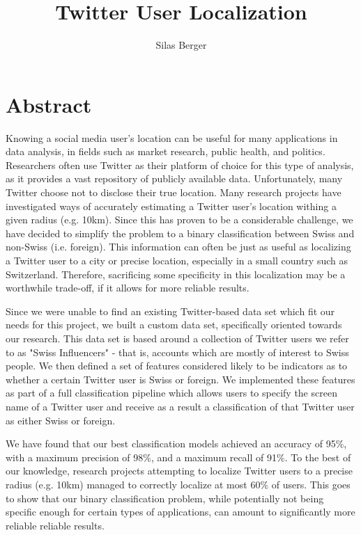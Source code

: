 \documentclass[10pt,a4paper]{article}
\title{Twitter User Localization\\[0.2em]\smaller{Master Thesis Report}}
\author{Silas Berger}
\begin{document}
\maketitle
\clearpage

\section*{Abstract}
Knowing a social media user's location can be useful for many applications in data analysis, in fields such as market research, public health, and politics. Researchers often use Twitter as their platform of choice for this type of analysis, as it provides a vast repository of publicly available data. Unfortunately, many Twitter choose not to disclose their true location. Many research projects have investigated ways of accurately estimating a Twitter user's location withing a given radius (e.g. 10km). Since this has proven to be a considerable challenge, we have decided to simplify the problem to a binary classification between Swiss and non-Swiss (i.e. foreign). This information can often be just as useful as localizing a Twitter user to a city or precise location, especially in a small country such as Switzerland. Therefore, sacrificing some specificity in this localization may be a worthwhile trade-off, if it allows for more reliable results.

Since we were unable to find an existing Twitter-based data set which fit our needs for this project, we built a custom data set, specifically oriented towards our research. This data set is based around a collection of Twitter users we refer to as "Swiss Influencers" - that is, accounts which are mostly of interest to Swiss people. We then defined a set of features considered likely to be indicators as to whether a certain Twitter user is Swiss or foreign. We implemented these features as part of a full classification pipeline which allows users to specify the screen name of a Twitter user and receive as a result a classification of that Twitter user as either Swiss or foreign. 

We have found that our best classification models achieved an accuracy of 95\%, with a maximum precision of 98\%, and a maximum recall of 91\%. To the best of our knowledge, research projects attempting to localize Twitter users to a precise radius (e.g. 10km) managed to correctly localize at most 60\% of users. This goes to show that our binary classification problem, while potentially not being specific enough for certain types of applications, can amount to significantly more reliable reliable results.
\end{document}
